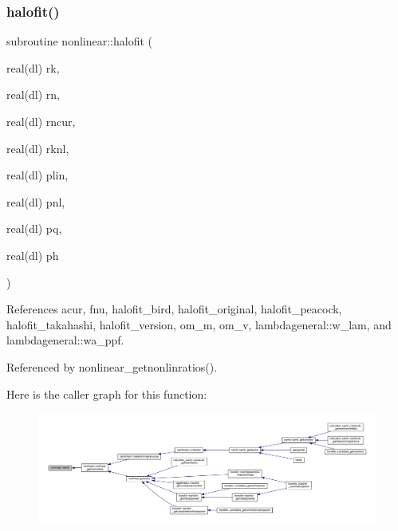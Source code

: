 \subsubsection{\texorpdfstring{halofit()}{halofit()}}
{\footnotesize\ttfamily subroutine nonlinear\+::halofit (\begin{DoxyParamCaption}\item[{real(dl)}]{rk,  }\item[{real(dl)}]{rn,  }\item[{real(dl)}]{rncur,  }\item[{real(dl)}]{rknl,  }\item[{real(dl)}]{plin,  }\item[{real(dl)}]{pnl,  }\item[{real(dl)}]{pq,  }\item[{real(dl)}]{ph }\end{DoxyParamCaption})\hspace{0.3cm}{\ttfamily [private]}}



References acur, fnu, halofit\+\_\+bird, halofit\+\_\+original, halofit\+\_\+peacock, halofit\+\_\+takahashi, halofit\+\_\+version, om\+\_\+m, om\+\_\+v, lambdageneral\+::w\+\_\+lam, and lambdageneral\+::wa\+\_\+ppf.



Referenced by nonlinear\+\_\+getnonlinratios().

Here is the caller graph for this function\+:
\nopagebreak
\begin{figure}[H]
\begin{center}
\leavevmode
\includegraphics[width=350pt]{namespacenonlinear_a76e8738685b7ce5757290a6441d5e850_icgraph}
\end{center}
\end{figure}
\mbox{\label{namespacenonlinear_a8b11cb79c822afc15ee5506a6b79e786}} 
